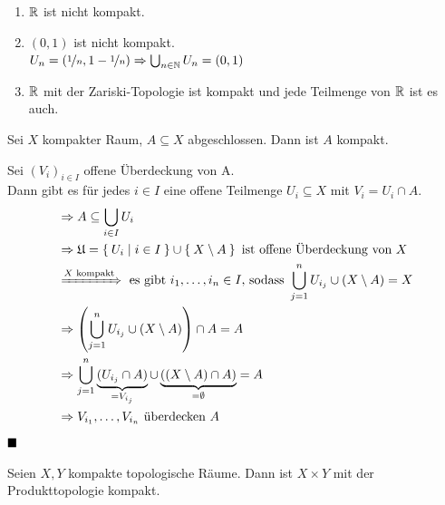 \begin{beispiel}
    \begin{enumerate}[label=\arabic*)]
        \item $\mathbb{R}$ ist nicht kompakt.
        \item $(0,1)$ ist nicht kompakt.\\
              $U_n = (\nicefrac{1}{n}, 1-\nicefrac{1}{n}) \Rightarrow \bigcup_{n \in \mathbb{N}} U_n = (0,1)$
        \item $\mathbb{R}$ mit der Zariski-Topologie ist kompakt und jede 
              Teilmenge von $\mathbb{R}$ ist es auch.
    \end{enumerate}
\end{beispiel}

\begin{korollar}\label{abgeschlossenInKomaktIstKompakt}
    Sei $X$ kompakter Raum, $A \subseteq X$ abgeschlossen. Dann ist
    $A$ kompakt.
\end{korollar}

\begin{beweis}
    Sei $(V_{i})_{i \in I}$ offene Überdeckung von A.\\
    Dann gibt es für jedes $i \in I$ eine offene Teilmenge $U_{i} \subseteq X$ mit $V_{i}=U_{i} \cap A$.
    \begin{align*}
        &\Rightarrow A \subseteq \bigcup_{i \in I} U_i\\
        &\Rightarrow \mathfrak{U} = \Set{U_i | i \in I} \cup \Set{X \setminus A} \text{ ist offene Überdeckung von } X\\
        &\xRightarrow{X \text{ kompakt}} \text{ es gibt } i_1, \dots, i_n \in I\text{, sodass }\bigcup_{j=1}^n U_{i_j} \cup (X \setminus A) = X\\
        &\Rightarrow \left (\bigcup_{j=1}^n U_{i_j} \cup (X \setminus A)\right ) \cap A = A\\
        &\Rightarrow \bigcup_{j=1}^n \underbrace{(U_{i_j} \cap A)}_{= V_{i_j}} \cup \underbrace{((X \setminus A) \cap A)}_{= \emptyset} = A\\
        &\Rightarrow V_{i_1}, \dots, V_{i_n} \text{ überdecken } A
    \end{align*}
    $\qed$
\end{beweis}

\begin{korollar}\label{kompaktTimesKompaktIstKompakt}
    Seien $X, Y$ kompakte topologische Räume. Dann ist $X \times Y$
    mit der Produkttopologie kompakt.
\end{korollar}


